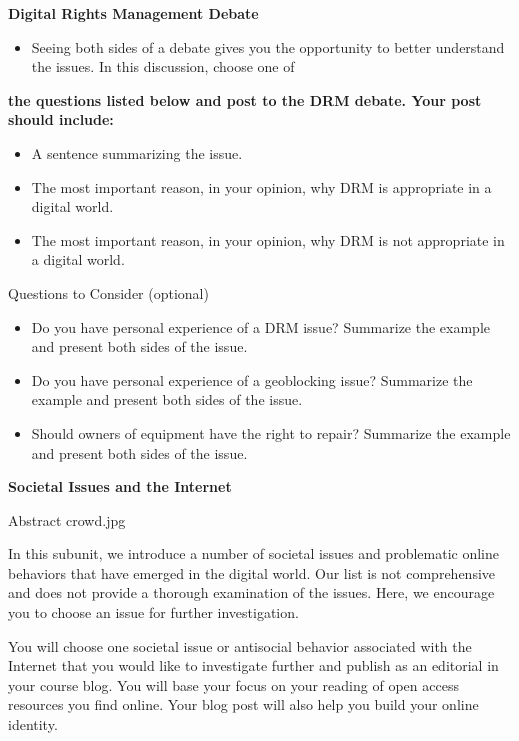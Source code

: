 \documentclass[
]{book}
\providecommand{\tightlist}{%
  \setlength{\itemsep}{0pt}\setlength{\parskip}{0pt}}
\theoremstyle{definition}
\theoremstyle{definition}
\theoremstyle{definition}
\theoremstyle{definition}
\theoremstyle{remark}
\begin{document}
\textbf{Digital Rights Management Debate}

\begin{itemize}
\tightlist
\item
  Seeing both sides of a debate gives you the opportunity to better understand the issues. In this discussion, choose one of
\end{itemize}

\textbf{the questions listed below and post to the DRM debate. Your post should include:}

\begin{itemize}
\tightlist
\item
  A sentence summarizing the issue.\\
\item
  The most important reason, in your opinion, why DRM is appropriate in a digital world.\\
\item
  The most important reason, in your opinion, why DRM is not appropriate in a digital world.
\end{itemize}

{Questions to Consider (optional)}

\begin{itemize}
\tightlist
\item
  Do you have personal experience of a DRM issue? Summarize the example and present both sides of the issue.\\
\item
  Do you have personal experience of a geoblocking issue? Summarize the example and present both sides of the issue.\\
\item
  Should owners of equipment have the right to repair? Summarize the example and present both sides of the issue.
\end{itemize}

\textbf{Societal Issues and the Internet}

{Abstract crowd.jpg}

In this subunit, we introduce a number of societal issues and problematic online behaviors that have emerged in the digital world. Our list is not comprehensive and does not provide a thorough examination of the issues. Here, we encourage you to choose an issue for further investigation.

You will choose one societal issue or antisocial behavior associated with the Internet that you would like to investigate further and publish as an editorial in your course blog. You will base your focus on your reading of open access resources you find online. Your blog post will also help you build your online identity.
\end{document}
